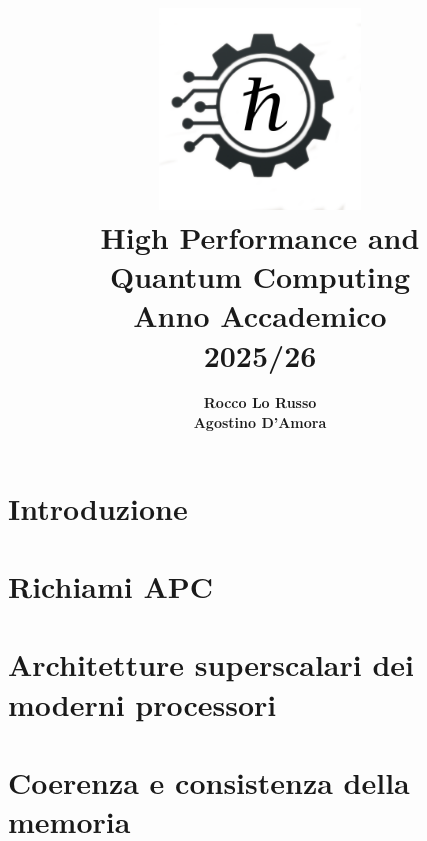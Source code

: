 \documentclass[a4paper,12pt, openany]{extbook}
\title{
    \includegraphics[width=0.4\textwidth]{fig/h_tagliato.png} \\ %
    \vspace{1cm}
    \Huge{High Performance and\\Quantum Computing} \\
    \vspace{0.5cm} 
    \Large{Anno Accademico\\2025/26}
}
\author{\textbf{Rocco Lo Russo}\\\textbf{Agostino D'Amora}} %
\date{}
\begin{document}
\maketitle

\tableofcontents
\newpage

\chapter*{Introduzione}


\chapter{Richiami APC} \label{chap:richiami_apc}





\chapter{Architetture superscalari dei moderni processori} \label{chap:architetture_superscalari}






\chapter{Coerenza e consistenza della memoria}





\end{document}
